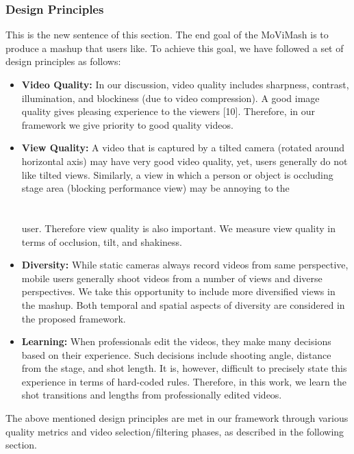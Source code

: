 \documentclass{sig-alternate}
\begin{document}
{{{\subsubsection{Design Principles}
This is the new sentence of this section.
The end goal of the MoViMash is to produce a mashup that users
like. To achieve this goal, we have followed a set of design principles
as follows:
\begin{itemize}
    \item \textbf{Video Quality: }In our discussion, video quality includes
sharpness, contrast, illumination, and blockiness (due to video
compression). A good image quality gives pleasing experience
to the viewers [10]. Therefore, in our framework we
give priority to good quality videos.
   \item \textbf{View Quality: }A video that is captured by a tilted camera
(rotated around horizontal axis) may have very good video
quality, yet, users generally do not like tilted views. Similarly,
a view in which a person or object is occluding stage
area (blocking performance view) may be annoying to the\\\\\\
user. Therefore view quality is also important. We measure
view quality in terms of occlusion, tilt, and shakiness.
   \item \textbf{Diversity: }While static cameras always record videos from
same perspective, mobile users generally shoot videos from
a number of views and diverse perspectives. We take this
opportunity to include more diversified views in the mashup.
Both temporal and spatial aspects of diversity are considered
in the proposed framework.
  \item \textbf{Learning: }When professionals edit the videos, they make
many decisions based on their experience. Such decisions
include shooting angle, distance from the stage, and shot
length. It is, however, difficult to precisely state this experience
in terms of hard-coded rules. Therefore, in this work,
we learn the shot transitions and lengths from professionally
edited videos.
\end{itemize}
The above mentioned design principles are met in our framework
through various quality metrics and video selection/filtering phases,
as described in the following section.

}}}
\end{document}
